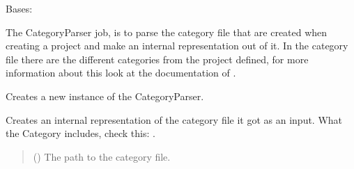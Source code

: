 \documentclass[letterpaper,10pt,english]{sphinxmanual}
\begin{document}
\begin{fulllineitems}
\label{\detokenize{apidoc/src.osm_configurator.model.parser:src.osm_configurator.model.parser.category_parser.CategoryParser}}
\pysigstartsignatures
{}
\pysigstopsignatures
\sphinxAtStartPar
Bases: {\hyperref[\detokenize{apidoc/src.osm_configurator.model.parser:src.osm_configurator.model.parser.category_parser_interface.CategoryParserInterface}]{}}

\sphinxAtStartPar
The CategoryParser job, is to parse the category file that are created when creating a project and
make an internal representation out of it.
In the category file there are the different categories from the project defined, for more information about this
look at the documentation of .

\begin{fulllineitems}
\label{\detokenize{apidoc/src.osm_configurator.model.parser:src.osm_configurator.model.parser.category_parser.CategoryParser.__init__}}
\pysigstartsignatures
{}
\pysigstopsignatures
\sphinxAtStartPar
Creates a new instance of the CategoryParser.

\end{fulllineitems}


\begin{fulllineitems}
\label{\detokenize{apidoc/src.osm_configurator.model.parser:src.osm_configurator.model.parser.category_parser.CategoryParser.parse_category_file}}
\pysigstartsignatures
{}
\pysigstopsignatures
\sphinxAtStartPar
Creates an internal representation of the category file it got as an input.
What the Category includes, check this: .
\begin{quote}\begin{description}
\sphinxAtStartPar
{} () \textendash{} The path to the category file.


\end{description}
\end{quote}
\end{fulllineitems}
\end{fulllineitems}
\end{document}
